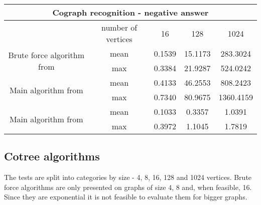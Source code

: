 \begin{center}

    \begin{tabular}{ |c|c|c|c|c|}
        \hline
        \multicolumn{5}{|c|}{Cograph recognition - negative answer}                                                  \\
        \hline
                                                                 & number of vertices & 16     & 128     & 1024      \\
        \hline
        \multirow{2}{*}{Brute force algorithm from \cite{habib}} & mean               & 0.1539 & 15.1173 & 283.3024  \\
                                                                 & max                & 0.3384 & 21.9287 & 524.0242  \\
        \hline
        \multirow{2}{*}{Main algorithm from \cite{habib}}        & mean               & 0.4133 & 46.2553 & 808.2423  \\
                                                                 & max                & 0.7340 & 80.9675 & 1360.4159 \\
        \hline
        \multirow{2}{*}{Main algorithm from \cite{corneil}}      & mean               & 0.1033 & 0.3357  & 1.0391    \\
                                                                 & max                & 0.3972 & 1.1045  & 1.7819    \\

        \hline
    \end{tabular}
\end{center}

\subsection{Cotree algorithms}

The tests are split into categories by size - 4, 8, 16, 128 and 1024  vertices. Brute force algorithms are only presented on graphs of size 4, 8 and, when feasible, 16. Since they are exponential it is not feasible to evaluate them for bigger graphs.


